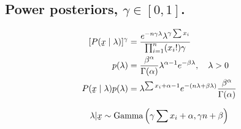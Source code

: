 \documentclass[12pt]{article}
\begin{document}
\subsection{Power posteriors, $\gamma \in [0,1]$.}
\begin{equation*}
    \begin{aligned}
[P(\underaccent{\tilde}x \mid \lambda)]^\gamma &=  \frac{e^{-n \gamma\lambda}\lambda^{\gamma\sum x_i}}{\prod_{i=1}^n (x_i!)\gamma}\\
         p(\lambda) &= \frac{\beta^\alpha}{\Gamma(\alpha)} \lambda^{\alpha-1} e^{-\beta \lambda},\quad \lambda >0\\
          P(\underaccent{\tilde}x \mid \lambda)  p(\lambda)&= \lambda^{\sum x_i + \alpha - 1} e^{-(n\lambda + \beta\lambda)} \frac{\beta^\alpha}{\Gamma(\alpha)}\\
    \end{aligned}
\end{equation*}

\begin{equation}
    \lambda|\underaccent{\tilde}x \sim \text{Gamma}\left(\gamma\sum x_i+\alpha, \gamma n+\beta\right)
\end{equation}



\end{document}
